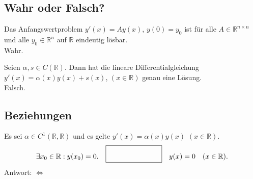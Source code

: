 \subsection{Wahr oder Falsch?}
Das Anfangswertproblem $y'(x) = Ay(x)$, $y(0) = y_0$ ist für alle $A \in \mathbb{R}^{n \times n}$ und alle $y_0 \in \mathbb{R}^n$ auf $\mathbb{R}$ eindeutig lösbar.\\
Wahr.

Seien $\alpha, s \in C(\mathbb{R})$.
Dann hat die lineare Differentialgleichung $y'(x) = \alpha(x)y(x) + s(x)$, $(x \in \mathbb{R})$ genau eine Lösung.\\
Falsch.

\subsection{Beziehungen}
Es sei $\alpha \in C^1(\mathbb{R}, \mathbb{R})$ und es gelte $y'(x) = \alpha(x) y(x)$ $(x \in \mathbb{R})$.
\begin{displaymath}
  \exists x_0 \in \mathbb{R} : y(x_0) = 0.
  \quad \fbox{\rule{1in}{0pt}\rule[-0.5ex]{0pt}{4ex}} \quad
  y(x) = 0 \quad (x \in \mathbb{R}).
\end{displaymath}
Antwort: $\iff$